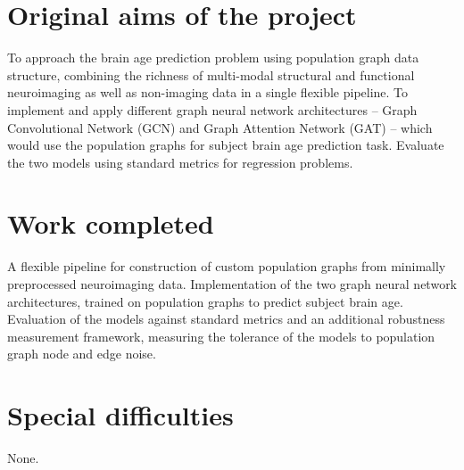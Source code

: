 
\section*{Original aims of the project}

To approach the brain age prediction problem using population graph data structure, combining the richness of multi-modal structural and functional neuroimaging as well as non-imaging data in a single flexible pipeline.
To implement and apply different graph neural network architectures – Graph Convolutional Network (GCN) and Graph Attention Network (GAT) – which would use the population graphs for subject brain age prediction task. Evaluate the two models using standard metrics for regression problems.


\section*{Work completed}
A flexible pipeline for construction of custom population graphs from minimally preprocessed neuroimaging data. Implementation of the two graph neural network architectures, trained on population graphs to predict subject brain age. Evaluation of the models against standard metrics and an additional robustness measurement framework, measuring the tolerance of the models to population graph node and edge noise.

\section*{Special difficulties}

None.

\tableofcontents


